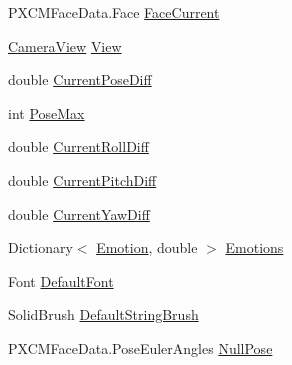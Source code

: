 \begin{DoxyCompactItemize}
\item 
P\+X\+C\+M\+Face\+Data.\+Face \hyperlink{class_real_sense_1_1_model_ad94686a4be9a84dd3ccd2522624644f6}{Face\+Current}
\item 
\hyperlink{class_real_sense_1_1_camera_view}{Camera\+View} \hyperlink{class_real_sense_1_1_model_ad06548f5b1e3b3bfeaca2635d2b24fc6}{View}
\item 
double \hyperlink{class_real_sense_1_1_model_a7a0873ddece63f5d3eb49f087771e9c6}{Current\+Pose\+Diff}
\item 
int \hyperlink{class_real_sense_1_1_model_a556c083ee213249d05c2383ffc8e46f4}{Pose\+Max}
\item 
double \hyperlink{class_real_sense_1_1_model_a7ba288087bcec5d88a34064df08fbf20}{Current\+Roll\+Diff}
\item 
double \hyperlink{class_real_sense_1_1_model_a9701d5e1b5c733f70349f94ec7fee978}{Current\+Pitch\+Diff}
\item 
double \hyperlink{class_real_sense_1_1_model_ae5d9b51742c782f5f79c38761cfaee3c}{Current\+Yaw\+Diff}
\item 
Dictionary$<$ \hyperlink{class_real_sense_1_1_model_a5bf3fde8f53519f7a740d8b4e0399208}{Emotion}, double $>$ \hyperlink{class_real_sense_1_1_model_a30358a7ea8e1e59815e2f562a3fc6bad}{Emotions}
\item 
Font \hyperlink{class_real_sense_1_1_model_a1e12c6ceac3f412e6b452148b1a97bb1}{Default\+Font}
\item 
Solid\+Brush \hyperlink{class_real_sense_1_1_model_aaee076946f30b272e403d39afe033b4e}{Default\+String\+Brush}
\item 
P\+X\+C\+M\+Face\+Data.\+Pose\+Euler\+Angles \hyperlink{class_real_sense_1_1_model_af6cb31aea9e1e0fd3ef87c9380e92193}{Null\+Pose}

\end{DoxyCompactItemize}

